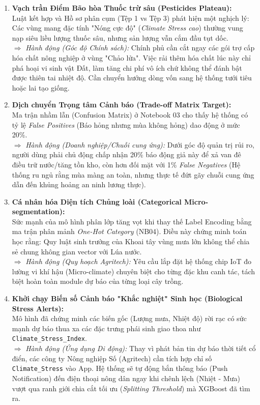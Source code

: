 \begin{enumerate}
    \item \textbf{Vạch trần Điểm Bão hòa Thuốc trừ sâu (Pesticides Plateau):}
    \\Luật kết hợp và Hồ sơ phân cụm (Tệp 1 vs Tệp 3) phát hiện một nghịch lý: Các vùng mang đặc tính "Nóng cực độ" (\textit{Climate Stress cao}) thường vung nạp siêu liều lượng thuốc sâu, nhưng sản lượng vẫn cắm đầu tụt dốc.
    \\$\Rightarrow$ \textit{Hành động (Góc độ Chính sách):} Chính phủ cần cắt ngay các gói trợ cấp hóa chất nông nghiệp ở vùng "Chảo lửa". Việc rải thêm hóa chất lúc này chỉ phá hoại vi sinh vật Đất, làm tăng chi phí vô ích chứ không thể đánh bật được thiên tai nhiệt độ. Cần chuyển hướng dòng vốn sang hệ thống tưới tiêu hoặc lai tạo giống.
    
    \item \textbf{Dịch chuyển Trọng tâm Cảnh báo (Trade-off Matrix Target):}
    \\Ma trận nhầm lẫn (Confusion Matrix) ở Notebook 03 cho thấy hệ thống có tỷ lệ \textit{False Positives} (Báo hỏng nhưng mùa không hỏng) dao động ở mức 20\%.
    \\$\Rightarrow$ \textit{Hành động (Doanh nghiệp/Chuỗi cung ứng):} Dưới góc độ quản trị rủi ro, người dùng phải chủ động chấp nhận 20\% báo động giả này để xả van đê điều trữ nước/tăng tồn kho, còn hơn đối mặt với 1\% \textit{False Negatives} (Hệ thống ru ngủ rằng mùa màng an toàn, nhưng thực tế đứt gãy chuỗi cung ứng dẫn đến khủng hoảng an ninh lương thực).
    
    \item \textbf{Cá nhân hóa Diện tích Chủng loài (Categorical Micro-segmentation):}
    \\Sức mạnh của mô hình phân lớp tăng vọt khi thay thế Label Encoding bằng ma trận phân mảnh \textit{One-Hot Category} (NB04). Điều này chứng minh toán học rằng: Quy luật sinh trưởng của Khoai tây vùng mưa lớn không thể chia sẻ chung không gian vector với Lúa nước.
    \\$\Rightarrow$ \textit{Hành động (Quy hoạch Agritech):} Yêu cầu lắp đặt hệ thống chip IoT đo lường vi khí hậu (Micro-climate) chuyên biệt cho từng đặc khu canh tác, tách biệt hoàn toàn module dự báo của từng loại cây trồng.
    
    \item \textbf{Khởi chạy Biến số Cảnh báo "Khắc nghiệt" Sinh học (Biological Stress Alerts):}
    \\Mô hình đã chứng minh các biến gốc (Lượng mưa, Nhiệt độ) rời rạc có sức mạnh dự báo thua xa các đặc trưng phái sinh giao thoa như \texttt{Climate\_Stress\_Index}.
    \\$\Rightarrow$ \textit{Hành động (Ứng dụng Di động):} Thay vì phát bản tin dự báo thời tiết cổ điển, các công ty Nông nghiệp Số (Agritech) cần tích hợp chỉ số \texttt{Climate\_Stress} vào App. Hệ thống sẽ tự động bắn thông báo (Push Notification) đến điện thoại nông dân ngay khi chênh lệch (Nhiệt - Mưa) vượt qua ranh giới chia cắt tối ưu (\textit{Splitting Threshold}) mà XGBoost đã tìm ra.
    

\end{enumerate}
